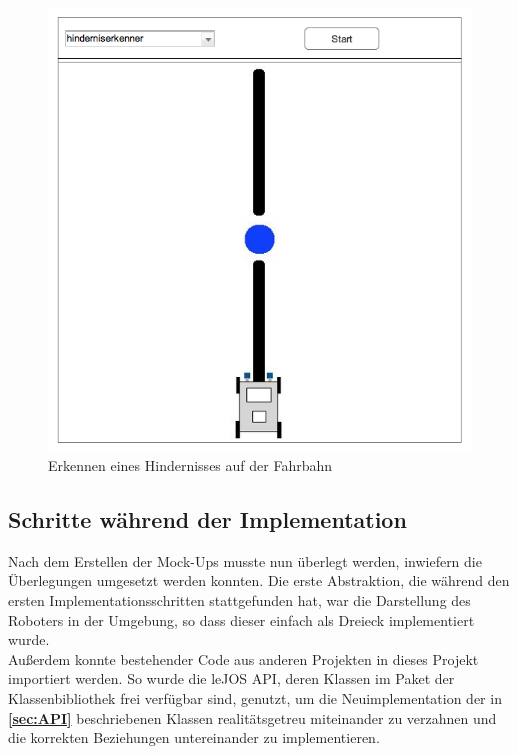 \documentclass[paper=a4, pagesize, DIV=calc, BCOR=12.5mm, twoside=on, onecolumn=on, open = any, titlepage =on, parskip =half-, headsepline = on, footsepline = on, chapterprefix = on, appendixprefix = off, fontsize = 12pt, numbers = noenddot, abstract = on]{scrbook}
\numberwithin{equation}{chapter}
\theoremstyle{definition}
\theoremstyle{plain}
\theoremstyle{plain}
\theoremstyle{remark}
\theoremstyle{plain}
\theoremstyle{plain}
\begin{document}
\begin{figure}[htbp]
\centering
\includegraphics[scale=0.4]{images/mockup_hinderniserkenner.png}
\caption{Erkennen eines Hindernisses auf der Fahrbahn}
\label{fig:hinderniserkenner}
\end{figure}
\par \singlespacing
\subsection{Schritte während der Implementation}
\onehalfspacing
Nach dem Erstellen der Mock-Ups musste nun überlegt werden, inwiefern die Überlegungen umgesetzt werden konnten. Die erste Abstraktion, die während den ersten Implementationsschritten stattgefunden hat, war die Darstellung des Roboters in der Umgebung, so dass dieser einfach als Dreieck implementiert wurde.\\

Außerdem konnte bestehender Code aus anderen Projekten in dieses Projekt importiert werden. So wurde die leJOS API, deren Klassen im Paket der Klassenbibliothek  frei verfügbar sind, genutzt, um die Neuimplementation der in \textbf{\ref{sec:API}} beschriebenen Klassen realitätsgetreu miteinander zu verzahnen und die korrekten Beziehungen untereinander zu implementieren.
\end{document}
